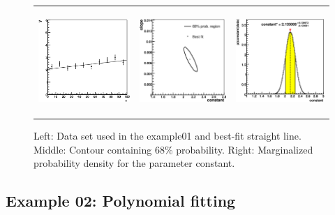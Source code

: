 \documentclass[11pt, a4paper]{article}
\begin{document}
\begin{figure}[ht!]
\begin{tabular}{ccc}
\begin{minipage}[t]{0.3\textwidth}\includegraphics[height=4.0cm]{example01_data.eps}\end{minipage} & 
\begin{minipage}[t]{0.3\textwidth}\includegraphics[height=4.0cm]{example01_correlation.eps}\end{minipage}  &
\begin{minipage}[t]{0.3\textwidth}\includegraphics[height=4.0cm]{example01_constant.eps}\end{minipage} 
\end{tabular}
\caption{Left: Data set used in the example01 and best-fit straight line. Middle: Contour containing 68\% probability. Right: Marginalized probability density for the parameter constant. 
\label{fig:example01}}
\end{figure}


\subsection{Example 02: Polynomial fitting} 
\end{document}
